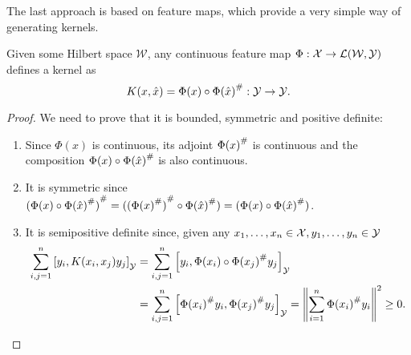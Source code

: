 The last approach is based on feature maps, which provide a very simple way of generating kernels.
\begin{lemma}
    Given some Hilbert space $\mathcal{W}$, any continuous feature map $\Phi: \mathcal{X} \to \mathcal{L}(\mathcal{W}, \mathcal{Y})$ defines a kernel as
    \begin{equation}
        \label{eq:kernel_featmap}
        K(x, \hat{x}) = \Phi(x) \circ \adj{\Phi(\hat{x})}: \Yspace \to \Yspace .
    \end{equation}
\end{lemma}
\begin{proof} We need to prove that it is bounded, symmetric and positive definite:
    \begin{enumerate}
        \item Since $\Phi(x)$ is continuous, its adjoint ${\Phi(x)}^{\#}$ is continuous and the composition $\Phi(x) \circ {\Phi(\hat{x})}^{\#}$ is also continuous.
        \item It is symmetric since  ${(\Phi(x) \circ {\Phi(\hat{x})}^{\#})}^{\#} = ({({\Phi(x)}^{\#})}^{\#} \circ {\Phi(\hat{x})}^{\#}) = (\Phi(x) \circ {\Phi(\hat{x})}^{\#}) $.
        \item It is semipositive definite since, given any $x_1, \ldots, x_n \in \mathcal{X},  y_1, \ldots, y_n \in \mathcal{Y}$
              \begin{equation}
                  \nonumber
                  \begin{aligned}
                      \sum_{i, j =1}^n \left[ y_i, K(x_i, x_j) y_j \right]_\mathcal{Y} & = \sum_{i, j =1}^n \left[ y_i,  \Phi(x_i) \circ {\Phi(x_j)}^{\#} y_j \right]_\mathcal{Y}                                                      \\
                                                                    & = \sum_{i, j =1}^n \left[ {\Phi(x_i)}^{\#} y_i,  {\Phi(x_j)}^{\#} y_j \right]_\mathcal{Y} = \left\lVert\sum_{i=1}^n {\Phi(x_i)}^{\#} y_i\right\rVert^2 \geq 0 .
                  \end{aligned}
              \end{equation}
    \end{enumerate}
\end{proof}


